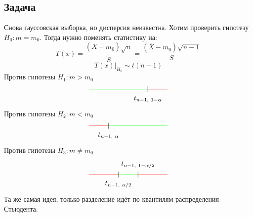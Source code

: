 \documentclass[12pt, a4paper]{article}
\begin{document}
\subsection*{Задача}
Снова гауссовская выборка, но дисперсия неизвестна. Хотим проверить гипотезу $H_0: m = m_0$. Тогда нужно поменять статистику на:
\[T(x) = \frac{(\overline{X} - m_0) \sqrt{n}}{\tilde{S}} = \frac{(\overline{X} - m_0)\sqrt{n - 1}}{S}\]
\[T(x) \big|_{H_0} \sim t(n - 1)\]
Против гипотезы $H_1: m > m_0$
\[\begin{tikzpicture}
    \draw[color=green] (-2, 0) -- (1, 0);
    \draw[color=red] (1, 0) -- (2, 0);
    \draw (1, 0.15) -- (1, -0.15);
    \node at (1, -0.5) (a) {$t_{n - 1,\ 1 - \alpha}$};
\end{tikzpicture}\]
Против гипотезы $H_2: m < m_0$
\[\begin{tikzpicture}
    \draw[color=green] (-1, 0) -- (2, 0);
    \draw[color=red] (-2, 0) -- (-1, 0);
    \draw (-1, -0.15) -- (-1, 0.15);
    \node at (-1, -0.5) (a) {$t_{n - 1,\ \alpha}$};
\end{tikzpicture}\]
Против гипотезы $H_3: m \neq m_0$
\[\begin{tikzpicture}
    \draw[color=red] (-2, 0) -- (-0.5, 0);
    \draw[color=red] (0.5, 0) -- (2, 0);
    \draw[color=green] (-0.5, 0) -- (0.5, 0);
    \draw (0.5, -0.15) -- (0.5, 0.15);
    \draw (-0.5, -0.15) -- (-0.5, 0.15);
    \node at(-0.5, -0.5) (a) {$t_{n - 1,\ \alpha/2}$};
    \node at(0.5, 0.5) (a) {$t_{n - 1,\ 1 - \alpha/2}$};
\end{tikzpicture}\]
Та же самая идея, только разделение идёт по квантилям распределения Стьюдента.
\end{document}
